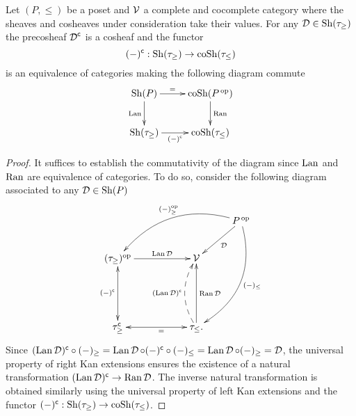 \documentclass[main.tex]{subfiles}
\begin{document}
\begin{lemma} \label{Sheaves on posets are sheaves on Alexandrov}
Let $(P,\leq)$ be a poset and $\operatorname{\mathcal{V}}$ a complete and cocomplete category where the sheaves and cosheaves under consideration take their values. For any $\operatorname{\mathcal{D}}\in\operatorname{Sh}(\tau_\geq)$ the precosheaf $\operatorname{\mathcal{D}}^{\mathsf{c}}$ is a cosheaf and the functor
$$(-)^{\mathsf{c}}:\operatorname{Sh}(\tau_\geq)\to\operatorname{coSh}(\tau_{\leq})$$
is an equivalence of categories making the following diagram commute
$$\xymatrix@C=2pc @R=2pc{ \Sh(P) \ar[d]_{\Lan} \ar[r]^-{=} & \coSh(P^{\,\op})  \ar[d]^{\Ran}  \\
\Sh(\tau_\geq) \ar[r]_-{(-)^{\c}} & \coSh(\tau_{\leq})}$$
\begin{proof}
It suffices to establish the commutativity of the diagram since $\operatorname{Lan}$ and $\operatorname{Ran}$ are equivalence of categories. To do so, consider the following diagram associated to any $\operatorname{\mathcal{D}}\in\operatorname{Sh}(P)$
$$\xymatrix{
                                     &&      & P^{\,\op} \ar[dl]^{\D} \ar@/_2pc/[dlll]_{(-)^{\op}_\geq} \ar@/^2pc/[dddl]^{(-)_\leq} \\
(\tau_\geq)^{\op} \ar[rr]^-{\Lan \D} && \V   &         \\
&&& \\
\tau_\geq^\c \ar@{<->}[uu]^{(-)^\c}  && \ar@{<->}[ll]^-{\ \ \ =} \tau_\leq \ar[uu]_-{\Ran\D} \ar@{-->}@/^1pc/[uu]^-{(\Lan\D)^{\c}}. & }$$
Since $(\operatorname{Lan}\operatorname{\mathcal{D}})^{\mathsf{c}}\circ(-)_\geq=\operatorname{Lan}\operatorname{\mathcal{D}}\circ(-)^{\mathsf{c}}\circ(-)_\leq=\operatorname{Lan}\operatorname{\mathcal{D}}\circ(-)_\geq=\operatorname{\mathcal{D}}$, the universal property of right Kan extensions ensures the existence of a natural transformation $(\operatorname{Lan}\operatorname{\mathcal{D}})^{\mathsf{c}}\to\operatorname{Ran}\operatorname{\mathcal{D}}$. The inverse natural transformation is obtained similarly using the universal property of left Kan extensions and the functor $(-)^{\mathsf{c}}:\operatorname{Sh}(\tau_\geq)\to\operatorname{coSh}(\tau_\leq)$.
\end{proof}
\end{lemma}
\end{document}
